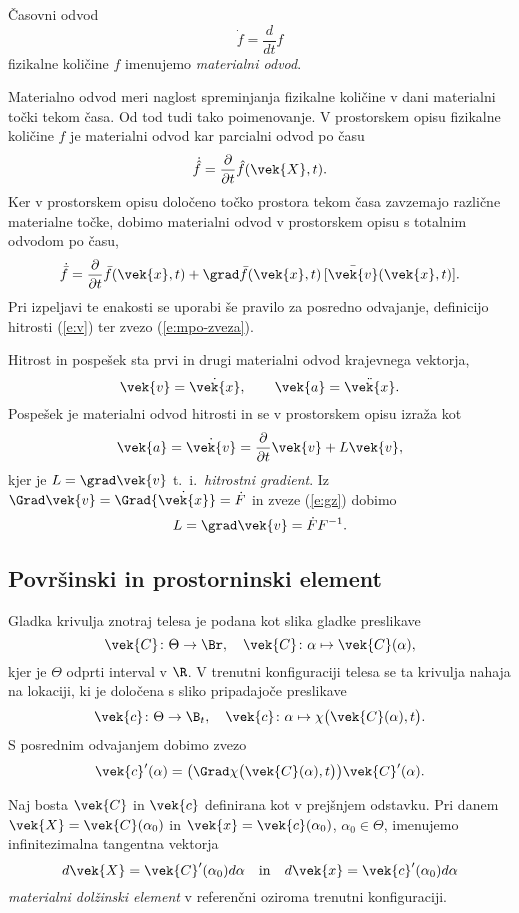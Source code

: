 \begin{definicija}
	Časovni odvod
	\[ \dot{f}=\frac{d}{dt}f \]
	fizikalne količine $f$ imenujemo \emph{materialni odvod}.
\end{definicija}
Materialno odvod meri naglost spreminjanja fizikalne količine v dani materialni točki tekom
časa. Od tod tudi tako poimenovanje. V prostorskem opisu fizikalne količine $f$ je materialni
odvod kar parcialni odvod po času
\[ \dot{\hat{f}}=\frac{\partial}{\partial t}\hat{f}(\vek{X},t). \]
Ker v prostorskem opisu določeno točko prostora tekom časa zavzemajo različne
materialne točke, dobimo materialni odvod v prostorskem opisu s totalnim odvodom po času,
\begin{equation} \label{e:matodv}
	\dot{\bar{f}} = \frac{\partial}{\partial t}\bar{f}(\vek{x},t) +
	\grad \bar{f}(\vek{x},t)\,[\bar{\vek{v}}(\vek{x},t)].
\end{equation}
Pri izpeljavi te enakosti se uporabi še pravilo za posredno odvajanje,
definicijo hitrosti (\ref{e:v}) ter zvezo (\ref{e:mpo-zveza}).
\begin{primer}
	Hitrost in pospešek sta prvi in drugi materialni odvod krajevnega vektorja,
	\[ \vek{v}=\dot{\vek{x}},\qquad \vek{a}=\ddot{\vek{x}}. \]
	Pospešek je materialni odvod hitrosti in se v prostorskem opisu izraža kot
	\[ \vek{a}=\dot{\vek{v}}=\frac{\partial}{\partial t}\vek{v}+L\vek{v}, \]
	kjer je $L=\grad\vek{v}$ t.~i.~\emph{hitrostni gradient}. Iz $\Grad\vek{v}=\Grad{\dot{\vek{x}}}=\dot{F}$ in
	zveze (\ref{e:gz}) dobimo
	\begin{equation} \label{e:L} L=\grad\vek{v}=\dot{F}F^{-1}. \end{equation}
\end{primer}


\subsection{Površinski in prostorninski element}


Gladka krivulja znotraj telesa je podana kot slika gladke preslikave
\[\vek{C}\colon \Theta\to\Br, \quad \vek{C}\colon\alpha\mapsto\vek{C}(\alpha),\]
kjer je $\Theta$ odprti interval v $\R$.
V trenutni konfiguraciji telesa se ta krivulja nahaja na lokaciji, ki je določena s sliko pripadajoče preslikave
\[ \vek{c}\colon \Theta\to\B_t,\quad \vek{c}\colon\alpha\mapsto\chi\big(\vek{C}(\alpha),t\big). \]
S posrednim odvajanjem dobimo zvezo
\begin{equation} \label{e:3101}
	\vek{c}'(\alpha) = \big( \Grad\chi\big(\vek{C}(\alpha),t\big)\big)\vek{C}'(\alpha).
\end{equation}
\begin{definicija}
	Naj bosta $\vek{C}$ in $\vek{c}$ definirana kot v prejšnjem odstavku.
	Pri danem $\vek{X}=\vek{C}(\alpha_0)$ in $\vek{x}=\vek{c}(\alpha_0)$, $\alpha_0\in\Theta$, imenujemo
	infinitezimalna tangentna vektorja
	\[ d\vek{X}=\vek{C}'(\alpha_0)d\alpha \quad \mathrm{in} \quad d\vek{x}=\vek{c}'(\alpha_0)d\alpha \]
	\emph{materialni dolžinski element} v referenčni oziroma trenutni konfiguraciji.
\end{definicija}

